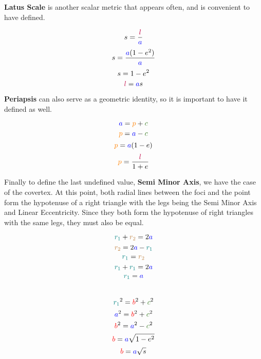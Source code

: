 \textbf{Latus Scale} is another scalar metric that appears often, and is convenient to have defined.

$$\textcolor{black}{s}=\frac{\textcolor{purple}{l}}{\textcolor{blue}{a}}$$
$$\textcolor{black}{s} = \frac{\textcolor{blue}{a}(1-\textcolor{black}{e}^2)} {\textcolor{blue}{a}}$$
$$\textcolor{black}{s} = 1-\textcolor{black}{e}^2$$
$$\textcolor{purple}{l} = \textcolor{blue}{a} \textcolor{black}{s}$$

\textbf{Periapsis} can also serve as a geometric identity, so it is important to have it defined as well.

\bigskip
\begin{minipage}{\textwidth}
\begin{multicols}{2}
\raggedcolumns
\noindent
$$\textcolor{blue}{a} = \textcolor{orange}{p} + \textcolor{OliveGreen}{c}$$
$$\textcolor{orange}{p} = \textcolor{blue}{a} - \textcolor{OliveGreen}{c}$$
$$\textcolor{orange}{p} = \textcolor{blue}{a}(1 - \textcolor{black}{e})$$
$$\textcolor{orange}{p} = \frac{\textcolor{purple}{l}}
{1 + \textcolor{black}{e}}$$
\end{multicols}
\end{minipage}
\bigskip

Finally to define the last undefined value, \textbf{Semi Minor Axis}, we have the case of the covertex. At this point, both radial lines between the foci and the point form the hypotenuse of a right triangle with the legs being the Semi Minor Axis and Linear Eccentricity. Since they both form the hypotenuse of right triangles with the same legs, they must also be equal.

\begin{minipage}{\textwidth}
\begin{multicols}{2}
\raggedcolumns
$$\textcolor{teal}{r_1} + \textcolor{brown}{r_2} = 2\textcolor{blue}{a}$$
$$\textcolor{brown}{r_2} = 2\textcolor{blue}{a} - \textcolor{teal}{r_1}
$$
$$\textcolor{teal}{r_1}=\textcolor{brown}{r_2}$$
$$\textcolor{teal}{r_1} + \textcolor{teal}{r_1} = 2\textcolor{blue}{a}$$
$$\textcolor{teal}{r_1} = \textcolor{blue}{a}$$
\columnbreak
\\$$\textcolor{teal}{r_1}^{2} = \textcolor{red}{b}^2 + \textcolor{OliveGreen}{c}^{2}$$
$$\textcolor{blue}{a}^{2} = \textcolor{red}{b}^2 + \textcolor{OliveGreen}{c}^{2}$$
$$\textcolor{red}{b}^{2} = \textcolor{blue}{a}^2 - \textcolor{OliveGreen}{c}^{2}$$
$$\textcolor{red}{b} = \textcolor{blue}{a}\sqrt{1-\textcolor{black}{e}^2}$$
$$\textcolor{red}{b} = \textcolor{blue}{a}\sqrt{\textcolor{black}{s}}$$
\end{multicols}
\end{minipage}


